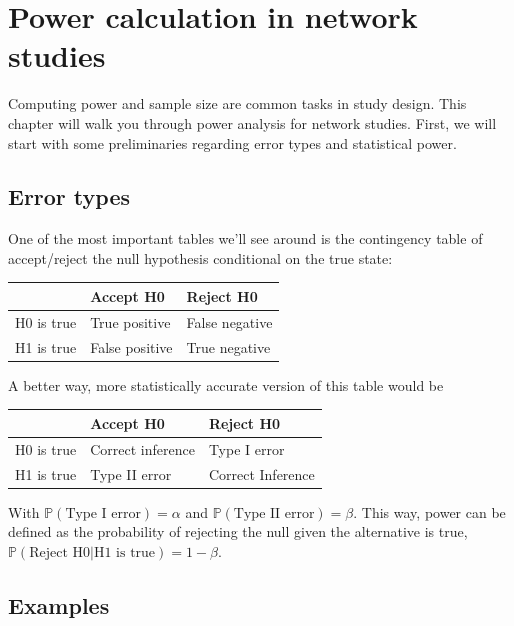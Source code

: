 \documentclass[]{book}
\begin{document}
\hypertarget{power-calculation-in-network-studies}{%
\chapter{Power calculation in network studies}\label{power-calculation-in-network-studies}}

Computing power and sample size are common tasks in study design. This chapter will walk you
through power analysis for network studies. First, we will start with some preliminaries
regarding error types and statistical power.

\hypertarget{error-types}{%
\section{Error types}\label{error-types}}

One of the most important tables we'll see around is the contingency table of accept/reject the null hypothesis conditional on the true state:

\begin{tabular}{l|l|l}
\hline
  & Accept H0 & Reject H0\\
\hline
H0 is true & True positive & False negative\\
\hline
H1 is true & False positive & True negative\\
\hline
\end{tabular}

A better way, more statistically accurate version of this table would be

\begin{tabular}{l|l|l}
\hline
  & Accept H0 & Reject H0\\
\hline
H0 is true & Correct inference & Type I error\\
\hline
H1 is true & Type II error & Correct Inference\\
\hline
\end{tabular}

With \(\mathbb{P}{(\mbox{Type I error})} = \alpha\) and \(\mathbb{P}{(\mbox{Type II error})} = \beta\). This way, power can be defined as the
probability of rejecting the null given the alternative is true, \(\mathbb{P}{(\mbox{Reject H0}|\mbox{H1 is true})} = 1-\beta\).

\hypertarget{examples-1}{%
\section{Examples}\label{examples-1}}
\end{document}

